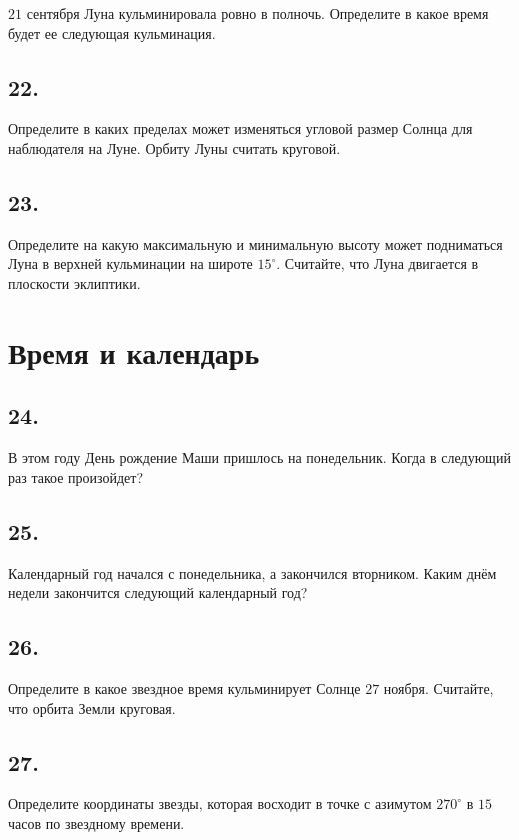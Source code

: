 \documentclass[a4paper,12pt]{article}
\begin{document}
$21$ сентября Луна кульминировала ровно в полночь. Определите в какое время будет ее следующая кульминация.

\subsection*{22.}

Определите в каких пределах может изменяться угловой размер Солнца для наблюдателя на Луне. Орбиту Луны считать круговой.

\subsection*{23.}

Определите на какую максимальную и минимальную высоту может подниматься Луна в верхней кульминации на широте $15^{\circ}$. Считайте, что Луна двигается в плоскости эклиптики.

\section*{Время и календарь}

\subsection*{24.} 

В этом году День рождение Маши пришлось на понедельник. Когда в следующий раз такое произойдет?  %

\subsection*{25.} 

Календарный год начался с понедельника, а закончился вторником. Каким днём недели закончится следующий календарный год? %

\subsection*{26.} 

Определите в какое звездное время кульминирует Солнце $27$ ноября. Считайте, что орбита Земли круговая.

\subsection*{27.}

Определите координаты звезды, которая восходит в точке с азимутом $270^{\circ}$ в $15$ часов по звездному времени.
\end{document}

